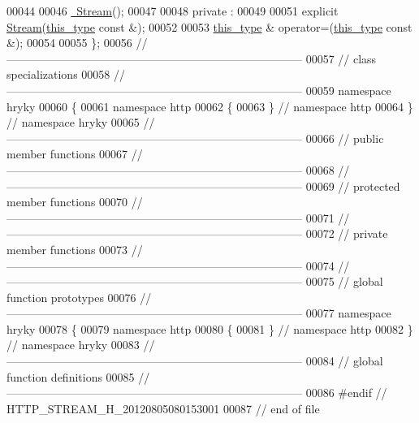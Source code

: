 \begin{DoxyCode}
00044 
00046     \hyperlink{classhryky_1_1http_1_1_stream_adbc88d3ec0a9d0ce497f575f44ef32a8}{~Stream}();
00047 
00048 \textcolor{keyword}{private} :
00049 
00051     \textcolor{keyword}{explicit} \hyperlink{classhryky_1_1http_1_1_stream_aa5ad1f5164b2bbfe98eec63a9553d2eb}{Stream}(\hyperlink{classhryky_1_1http_1_1_stream}{this_type} \textcolor{keyword}{const} &);
00052 
00053     \hyperlink{classhryky_1_1http_1_1_stream}{this_type} & operator=(\hyperlink{classhryky_1_1http_1_1_stream}{this_type} \textcolor{keyword}{const} &);
00054 
00055 \};
00056 \textcolor{comment}{//
      ------------------------------------------------------------------------------}
00057 \textcolor{comment}{// class specializations}
00058 \textcolor{comment}{//
      ------------------------------------------------------------------------------}
00059 \textcolor{keyword}{namespace }hryky
00060 \{
00061 \textcolor{keyword}{namespace }http
00062 \{
00063 \} \textcolor{comment}{// namespace http}
00064 \} \textcolor{comment}{// namespace hryky}
00065 \textcolor{comment}{//
      ------------------------------------------------------------------------------}
00066 \textcolor{comment}{// public member functions}
00067 \textcolor{comment}{//
      ------------------------------------------------------------------------------}
00068 \textcolor{comment}{//
      ------------------------------------------------------------------------------}
00069 \textcolor{comment}{// protected member functions}
00070 \textcolor{comment}{//
      ------------------------------------------------------------------------------}
00071 \textcolor{comment}{//
      ------------------------------------------------------------------------------}
00072 \textcolor{comment}{// private member functions}
00073 \textcolor{comment}{//
      ------------------------------------------------------------------------------}
00074 \textcolor{comment}{//
      ------------------------------------------------------------------------------}
00075 \textcolor{comment}{// global function prototypes}
00076 \textcolor{comment}{//
      ------------------------------------------------------------------------------}
00077 \textcolor{keyword}{namespace }hryky
00078 \{
00079 \textcolor{keyword}{namespace }http
00080 \{
00081 \} \textcolor{comment}{// namespace http}
00082 \} \textcolor{comment}{// namespace hryky}
00083 \textcolor{comment}{//
      ------------------------------------------------------------------------------}
00084 \textcolor{comment}{// global function definitions}
00085 \textcolor{comment}{//
      ------------------------------------------------------------------------------}
00086 \textcolor{preprocessor}{#endif // HTTP\_STREAM\_H\_20120805080153001}
00087 \textcolor{preprocessor}{}\textcolor{comment}{// end of file}
\end{DoxyCode}

